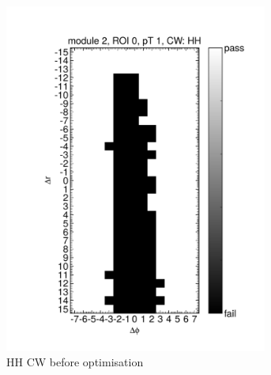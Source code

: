 \begin{figure}[htbp]
	\centering
	\begin{subfigure}[b]{0.45\textwidth}
		\centering
		\includegraphics[width=0.95\textwidth]{figures/muontrigger/l1mu4/cw_0025/cwplot_module2_roi0_pt1_cwHH.pdf}
		\caption{HH CW before optimisation}
	\end{subfigure}
	\begin{subfigure}[b]{0.45\textwidth}
		\centering

\end{subfigure}
\end{figure}
